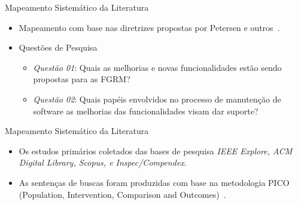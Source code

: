 \documentclass[t,14pt,mathserif]{beamer}
\begin{document}
\begin{frame}{Mapeamento Sistemático da Literatura}

    \begin{itemize}
        \item Mapeamento com base nas diretrizes propostas por Petersen e
            outros~\cite{Petersen2008}.
        \item Questões de Pesquisa
            \begin{itemize}
                \item \textit{Questão 01}: Quais as melhorias e novas
                funcionalidades estão sendo propostas para as FGRM\@?
                \item \textit{Questão 02}: Quais papéis envolvidos no processo de
                    manutenção de software as melhorias das funcionalidades visam
                    dar suporte?
            \end{itemize}
    \end{itemize}

\end{frame}

\begin{frame}{Mapeamento Sistemático da Literatura}

    \begin{itemize}
       \item Os estudos primários coletados das bases de pesquisa \textit{IEEE
             Explore, ACM Digital Library, Scopus, e Inspec/Compendex}.
     \item As sentenças de buscas foram produzidas com base na metodologia PICO
          (Population, Intervention, Comparison and
          Outcomes)~\cite{keele2007guidelines}.
    \end{itemize}

\end{frame}
\end{document}
